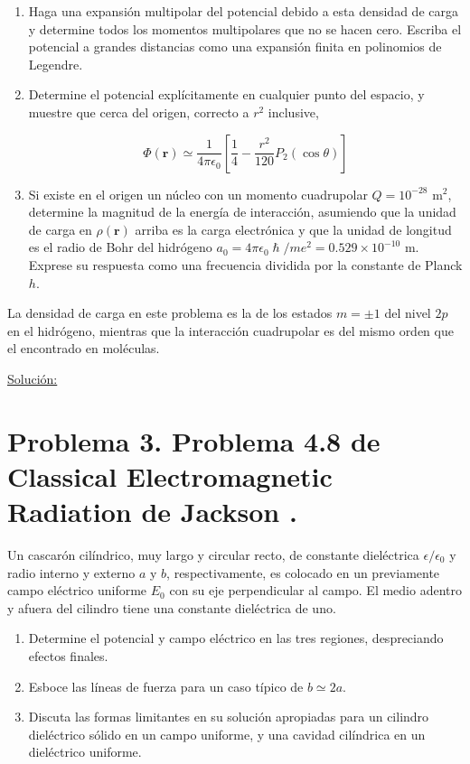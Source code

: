 \documentclass[a4paper,11pt]{article}
\numberwithin{equation}{section}
\begin{document}
\begin{enumerate}[label=\textbf{(\alph*)}]
\item Haga una expansión multipolar del potencial debido a esta densidad de 
carga y determine todos los momentos multipolares que no se hacen cero. Escriba 
el potencial a grandes distancias como una expansión finita en polinomios de 
Legendre. 
\item Determine el potencial explícitamente en cualquier punto del espacio, y 
muestre que cerca del origen, correcto a $r^2$ inclusive,

$$
\Phi(\mathbf{r}) \simeq \frac{1}{4\pi\epsilon_0}\left[\frac{1}{4} 
 - \frac{r^2}{120}P_2(\cos{\theta})\right]
$$

\item Si existe en el origen un núcleo con un momento cuadrupolar $Q = 10^{-28}$ m$^2$, 
determine la magnitud de la energía de interacción, asumiendo que la unidad de 
carga en $\rho(\mathbf{r})$ arriba es la carga electrónica y que la unidad de 
longitud es el radio de Bohr del hidrógeno $a_0 = 4\pi\epsilon_0\hslash/me^2 = 
0.529 \times 10^{-10}$ m. Exprese su respuesta como una frecuencia dividida por 
la constante de Planck $h$.
\end{enumerate}

La densidad de carga en este problema es la de los estados $m = \pm 1$ del nivel 
$2p$ en el hidrógeno, mientras que la interacción cuadrupolar es del mismo orden 
que el encontrado en moléculas.

\vspace{.3cm}

\underline{Solución:} \vspace{.3cm}

\newpage

\section{Problema 3. Problema 4.8 de Classical Electromagnetic Radiation
de Jackson \cite{jackson}.}

Un cascarón cilíndrico, muy largo y circular recto, de constante dieléctrica 
$\epsilon/\epsilon_0$ y radio interno y externo $a$ y $b$, respectivamente, 
es colocado en un previamente campo eléctrico uniforme $E_0$ con su eje perpendicular 
al campo. El medio adentro y afuera del cilindro tiene una constante dieléctrica de 
uno.

\begin{enumerate}[label=\textbf{(\alph*)}]
\item Determine el potencial y campo eléctrico en las tres regiones, despreciando 
efectos finales.
\item Esboce las líneas de fuerza para un caso típico de $b \simeq 2a$.
\item Discuta las formas limitantes en su solución apropiadas para un cilindro 
dieléctrico sólido en un campo uniforme, y una cavidad cilíndrica en un dieléctrico 
uniforme.
\end{enumerate}
\end{document}
